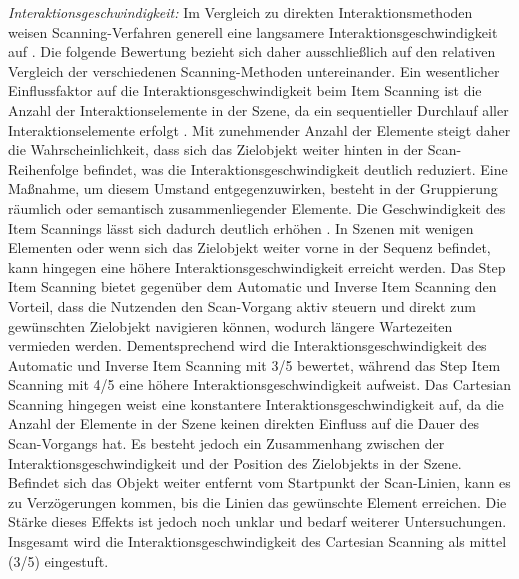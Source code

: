 \textit{Interaktionsgeschwindigkeit:}
Im Vergleich zu direkten Interaktionsmethoden weisen Scanning-Verfahren generell eine langsamere Interaktionsgeschwindigkeit auf \citep{COOK2015117}. Die folgende Bewertung bezieht sich daher ausschließlich auf den relativen Vergleich der verschiedenen Scanning-Methoden untereinander. 
Ein wesentlicher Einflussfaktor auf die Interaktionsgeschwindigkeit beim Item Scanning ist die Anzahl der Interaktionselemente in der Szene, da ein sequentieller Durchlauf aller Interaktionselemente erfolgt \cite{10.1145/2159365.2159386}. Mit zunehmender Anzahl der Elemente steigt daher die Wahrscheinlichkeit, dass sich das Zielobjekt weiter hinten in der Scan-Reihenfolge befindet, was die Interaktionsgeschwindigkeit deutlich reduziert. Eine Maßnahme, um diesem Umstand entgegenzuwirken, besteht in der Gruppierung räumlich oder semantisch zusammenliegender Elemente. Die Geschwindigkeit des Item Scannings lässt sich dadurch deutlich erhöhen \citep{COOK2015117}. In Szenen mit wenigen Elementen oder wenn sich das Zielobjekt weiter vorne in der Sequenz befindet, kann hingegen eine höhere Interaktionsgeschwindigkeit erreicht werden. Das Step Item Scanning bietet gegenüber dem Automatic und Inverse Item Scanning den Vorteil, dass die Nutzenden den Scan-Vorgang aktiv steuern und direkt zum gewünschten Zielobjekt navigieren können, wodurch längere Wartezeiten vermieden werden. Dementsprechend wird die Interaktionsgeschwindigkeit des Automatic und Inverse Item Scanning mit 3/5 bewertet, während das Step Item Scanning mit 4/5 eine höhere Interaktionsgeschwindigkeit aufweist.
Das Cartesian Scanning hingegen weist eine konstantere Interaktionsgeschwindigkeit auf, da die Anzahl der Elemente in der Szene keinen direkten Einfluss auf die Dauer des Scan-Vorgangs hat. Es besteht jedoch ein Zusammenhang zwischen der Interaktionsgeschwindigkeit und der Position des Zielobjekts in der Szene. Befindet sich das Objekt weiter entfernt vom Startpunkt der Scan-Linien, kann es zu Verzögerungen kommen, bis die Linien das gewünschte Element erreichen. Die Stärke dieses Effekts ist jedoch noch unklar und bedarf weiterer Untersuchungen. Insgesamt wird die Interaktionsgeschwindigkeit des Cartesian Scanning als mittel (3/5) eingestuft.

